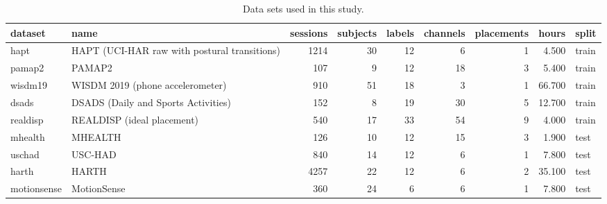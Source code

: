 \begin{table}
\caption{Data sets used in this study.}
\label{tab:T1_datasets_overview}
\begin{tabular}{llrrrrrrl}
\toprule
dataset & name & sessions & subjects & labels & channels & placements & hours & split \\
\midrule
hapt & HAPT (UCI-HAR raw with postural transitions) & 1214 & 30 & 12 & 6 & 1 & 4.500 & train \\
pamap2 & PAMAP2 & 107 & 9 & 12 & 18 & 3 & 5.400 & train \\
wisdm19 & WISDM 2019 (phone accelerometer) & 910 & 51 & 18 & 3 & 1 & 66.700 & train \\
dsads & DSADS (Daily and Sports Activities) & 152 & 8 & 19 & 30 & 5 & 12.700 & train \\
realdisp & REALDISP (ideal placement) & 540 & 17 & 33 & 54 & 9 & 4.000 & train \\
mhealth & MHEALTH & 126 & 10 & 12 & 15 & 3 & 1.900 & test \\
uschad & USC-HAD & 840 & 14 & 12 & 6 & 1 & 7.800 & test \\
harth & HARTH & 4257 & 22 & 12 & 6 & 2 & 35.100 & test \\
motionsense & MotionSense & 360 & 24 & 6 & 6 & 1 & 7.800 & test \\
\bottomrule
\end{tabular}
\end{table}
